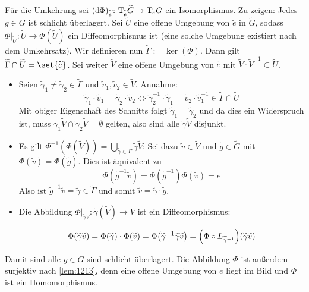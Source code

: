 \begin{beweis}
\begin{enumerate}[(1)]
        Für die Umkehrung sei $(\mathrm{d}\mkern-1.0mu \Phi)_{\widetilde{e}} \colon \mathrm{T}\mkern-0.85mu_{\widetilde{e}} \widetilde{G} \to \mathrm{T}\mkern-0.85mu_e G$ ein Isomorphismus.
        Zu zeigen: Jedes $g \in G$ ist schlicht überlagert.
        Sei $\widetilde{U}$ eine offene Umgebung von $\widetilde{e}$ in $\widetilde{G}$, sodass $\Phi|_{\widetilde{U}} \colon \widetilde{U} \to \Phi(\widetilde{U})$ ein Diffeomorphismus ist (eine solche Umgebung existiert nach dem Umkehrsatz).
        Wir definieren nun $\widetilde{\Gamma} := \ker (\Phi)$.
        Dann gilt $\widetilde{\Gamma} \cap \widetilde{U}= \set{\widetilde{e}}$.
        Sei weiter $\widetilde{V}$ eine offene Umgebung von $\widetilde{e}$ mit $\widetilde{V} \cdot \widetilde{V}^{-1} \subset \widetilde{U}$.
        \begin{itemize}
            \item  Seien $\widetilde{\gamma}_1 \neq \widetilde{\gamma}_2 \in \widetilde{\Gamma}$ und $\widetilde{v}_1, \widetilde{v}_2 \in \widetilde{V}$.
            Annahme:
            \[
                \widetilde{\gamma}_1 \cdot \widetilde{v}_1 = \widetilde{\gamma}_2 \cdot \widetilde{v}_2 \iff \widetilde{\gamma}_2^{-1} \cdot \widetilde{\gamma}_1 = \widetilde{v}_2 \cdot \widetilde{v}_1^{-1} \in \widetilde{\Gamma} \cap \widetilde{U}
            \]
            Mit obiger Eigenschaft des Schnitts folgt $\widetilde{\gamma}_1 = \widetilde{\gamma}_2$ und da dies ein Widerspruch ist, muss $\widetilde{\gamma}_1 \widetilde{V} \cap \widetilde{\gamma}_2 \widetilde{V} = \emptyset$ gelten, also sind alle $\widetilde{\gamma} \widetilde{V}$ disjunkt.
            \item Es gilt $\Phi^{-1}(\Phi(\widetilde{V})) = \bigcup_{\widetilde{\gamma} \in \widetilde{\Gamma}} \widetilde{\gamma}\widetilde{V}$:
            Sei dazu $\widetilde{v} \in  \widetilde{V}$ und $\widetilde{g} \in \widetilde{G}$ mit $\Phi(\widetilde{v}) = \Phi(\widetilde{g})$.
            Dies ist äquivalent zu
            \[
                \Phi(\widetilde{g}^{-1} \widetilde{v}) = \Phi(\widetilde{g}^{-1}) \Phi(\widetilde{v}) = e
            \]
            Also ist $\widetilde{g}^{-1} \widetilde{v} = \widetilde{\gamma} \in \widetilde{\Gamma}$ und somit $\widetilde{v} = \widetilde{\gamma} \cdot \widetilde{g}$.
            \item Die Abbildung $\Phi|_{\widetilde{\gamma} \widetilde{V}} \colon \widetilde{\gamma}(\widetilde{V}) \to V$ ist ein Diffeomorphismus:
            
            \[
                \Phi(\widetilde{\gamma} \widetilde{v}) = \Phi(\widetilde{\gamma}) \cdot \Phi(\widetilde{v}) = \Phi \enbrace*{\widetilde{\gamma}^{-1} \widetilde{\gamma} \widetilde{v}} = \enbrace*{\Phi \circ L_{\widetilde{\gamma}^{-1}}} (\widetilde{\gamma} \widetilde{v})
            \]
        \end{itemize}
		Damit sind alle $g \in G$ sind schlicht überlagert.
		Die Abbildung $\Phi$ ist außerdem surjektiv nach \autoref{lem:1213}, denn eine offene Umgebung von $e$ liegt im Bild und $\Phi$ ist ein Homomorphismus.\qedhere
    \end{enumerate}
\end{beweis}

